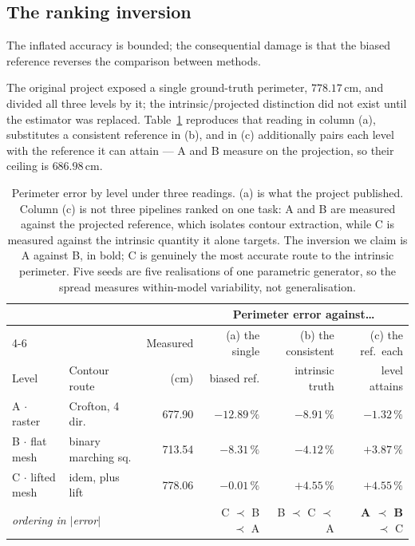 \documentclass{article}
\begin{document}
\subsection{The ranking inversion}
\label{sec:inversion}

The inflated accuracy is bounded; the consequential damage is that the biased reference reverses the comparison between methods.

The original project exposed a single ground-truth perimeter, $778.17$\,cm, and divided all three
levels by it; the intrinsic/projected distinction did not exist until the estimator was replaced.
Table~\ref{tab:inversion} reproduces that reading in column (a), substitutes a consistent
reference in (b), and in (c) additionally pairs each level with the reference it can attain --- A
and B measure on the projection, so their ceiling is $686.98$\,cm.

\begin{table}[htbp]
\centering
\caption{Perimeter error by level under three readings. (a) is what the project published.
Column (c) is not three pipelines ranked on one task: A and B are measured against the projected
reference, which isolates contour extraction, while C is measured against the intrinsic quantity it
alone targets. The inversion we claim is A against B, in bold; C is genuinely the most accurate
route to the intrinsic perimeter. Five seeds are five realisations of one parametric generator, so
the spread measures within-model variability, not generalisation.}
\label{tab:inversion}
\small
\begin{tabular}{llrrrr}
\toprule
& & & \multicolumn{3}{c}{Perimeter error against\ldots} \\
\cmidrule(l){4-6}
& & Measured & (a) the single & (b) the consistent & (c) the ref.\ each \\
Level & Contour route & (cm) & biased ref. & intrinsic truth & level attains \\
\midrule
A $\cdot$ raster      & Crofton, 4 dir.      & 677.90 & $-12.89\,\%$ & $-8.91\,\%$ & $\mathbf{-1.32\,\%}$ \\
B $\cdot$ flat mesh   & binary marching sq.  & 713.54 & $-8.31\,\%$  & $-4.12\,\%$ & $+3.87\,\%$ \\
C $\cdot$ lifted mesh & idem, plus lift      & 778.06 & $-0.01\,\%$  & $+4.55\,\%$ & $+4.55\,\%$ \\
\midrule
\multicolumn{3}{l}{\emph{ordering in $|$error$|$}} & C $\prec$ B $\prec$ A & B $\prec$ C $\prec$ A & \textbf{A $\prec$ B} $\prec$ C \\
\bottomrule
\end{tabular}
\end{table}
\end{document}

